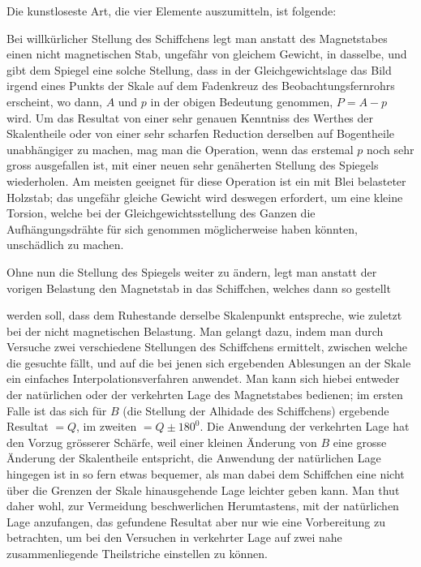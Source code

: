 Die kunstloseste Art, die vier Elemente auszumitteln, ist folgende:

Bei willkürlicher Stellung des Schiffchens legt man anstatt des Magnetstabes einen nicht magnetischen Stab, ungefähr von gleichem Gewicht, in dasselbe, und gibt dem Spiegel eine solche Stellung, dass in der Gleichgewichtslage das Bild irgend eines Punkts der Skale auf dem Fadenkreuz des Beobachtungsfernrohrs erscheint, wo dann, $A$ und $p$ in der obigen Bedeutung genommen, $P=A-p$ wird. Um das Resultat von einer sehr genauen Kenntniss des Werthes der Skalentheile oder von einer sehr scharfen Reduction derselben auf Bogentheile unabhängiger zu machen, mag man die Operation, wenn das erstemal $p$ noch sehr gross ausgefallen ist, mit einer neuen sehr genäherten Stellung des Spiegels wiederholen. Am meisten geeignet für diese Operation ist ein mit Blei belasteter Holzstab; das ungefähr gleiche Gewicht wird deswegen erfordert, um eine kleine Torsion, welche bei der Gleichgewichtsstellung des Ganzen die Aufhängungsdrähte für sich genommen möglicherweise haben könnten, unschädlich zu machen.

Ohne nun die Stellung des Spiegels weiter zu ändern, legt man anstatt der vorigen Belastung den Magnetstab in das Schiffchen, welches dann so gestellt
\par\clearpage
{}
\noindent werden soll, dass dem Ruhestande derselbe Skalenpunkt entspreche, wie zuletzt bei der nicht magnetischen Belastung. Man gelangt dazu, indem man durch Versuche zwei verschiedene Stellungen des Schiffchens ermittelt, zwischen welche die gesuchte fällt, und auf die bei jenen sich ergebenden Ablesungen an der Skale ein einfaches Interpolationsverfahren anwendet. Man kann sich hiebei entweder der natürlichen oder der verkehrten Lage des Magnetstabes bedienen; im ersten Falle ist das sich für $B$ (die Stellung der Alhidade des Schiffchens) ergebende Resultat $=Q$, im zweiten $=Q\pm180^0$. Die Anwendung der verkehrten Lage hat den Vorzug grösserer Schärfe, weil einer kleinen Änderung von $B$ eine grosse Änderung der Skalentheile entspricht, die Anwendung der natürlichen Lage hingegen ist in so fern etwas bequemer, als man dabei dem Schiffchen eine nicht über die Grenzen der Skale hinausgehende Lage leichter geben kann. Man thut daher wohl, zur Vermeidung beschwerlichen Herumtastens, mit der natürlichen Lage anzufangen, das gefundene Resultat aber nur wie eine Vorbereitung zu betrachten, um bei den Versuchen in verkehrter Lage auf zwei nahe zusammenliegende Theilstriche einstellen zu können.

